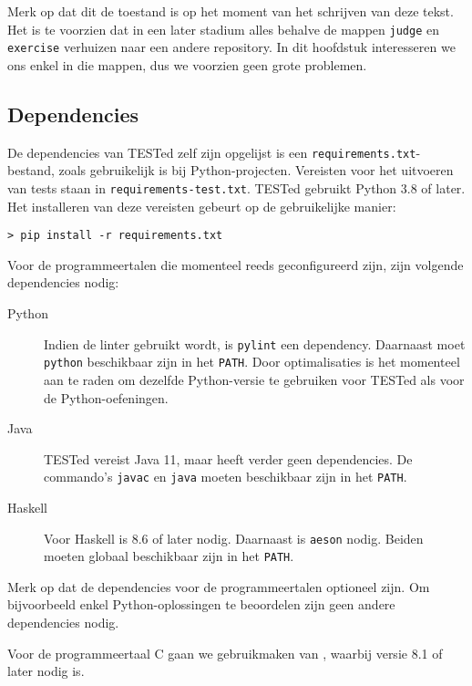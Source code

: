 \inputminted{text}{code/dirs-tested.txt}

Merk op dat dit de toestand is op het moment van het schrijven van deze tekst.
Het is te voorzien dat in een later stadium alles behalve de mappen \texttt{judge} en \texttt{exercise} verhuizen naar een andere repository.
In dit hoofdstuk interesseren we ons enkel in die mappen, dus we voorzien geen grote problemen.

\subsection{Dependencies}\label{subsec:dependencies}

De dependencies van TESTed zelf zijn opgelijst is een \texttt{requirements.txt}-bestand, zoals gebruikelijk is bij Python-projecten.
Vereisten voor het uitvoeren van tests staan in \texttt{requirements-test.txt}.
TESTed gebruikt Python 3.8 of later.
Het installeren van deze vereisten gebeurt op de gebruikelijke manier:

\begin{verbatim}
> pip install -r requirements.txt
\end{verbatim}

Voor de programmeertalen die momenteel reeds geconfigureerd zijn, zijn volgende dependencies nodig:

\begin{description}
    \item[Python] Indien de linter gebruikt wordt, is \texttt{pylint} een dependency.
    Daarnaast moet \texttt{python} beschikbaar zijn in het \texttt{PATH}.
    Door optimalisaties is het momenteel aan te raden om dezelfde Python-versie te gebruiken voor TESTed als voor de Python-oefeningen.
    \item[Java] TESTed vereist Java 11, maar heeft verder geen dependencies.
    De commando's \texttt{javac} en \texttt{java} moeten beschikbaar zijn in het \texttt{PATH}.
    \item[Haskell] Voor Haskell is  8.6 of later nodig.
    Daarnaast is \texttt{aeson} nodig.
    Beiden moeten globaal beschikbaar zijn in het \texttt{PATH}.
\end{description}

Merk op dat de dependencies voor de programmeertalen optioneel zijn.
Om bijvoorbeeld enkel Python-oplossingen te beoordelen zijn geen andere dependencies nodig.

Voor de programmeertaal C gaan we gebruikmaken van , waarbij versie 8.1 of later nodig is.

